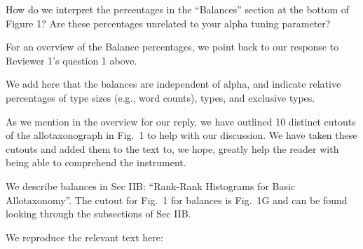 \begin{reviewercomment}
  How do we interpret the percentages in the ``Balances'' section at the bottom of Figure 1? Are these percentages unrelated to your alpha tuning parameter? 
\end{reviewercomment}


For an overview of the Balance percentages,
we point back to our response to Reviewer 1's question 1 above.

We add here that the balances are independent of alpha, and indicate relative percentages
of type sizes (e.g., word counts), types, and exclusive types.

As we mention in the overview for our reply,
we have outlined 10 distinct cutouts of the allotaxonograph
in Fig.~1 to help with our discussion.
We have taken these cutouts and added them to
the text to, we hope, greatly help the reader with being
able to comprehend the instrument.

We describe balances in Sec IIB: ``Rank-Rank Histograms for Basic Allotaxonomy''.
The cutout for Fig.~1 for balances is Fig.~1G and can be found looking through
the subsections of Sec IIB.

We reproduce the relevant text here:

